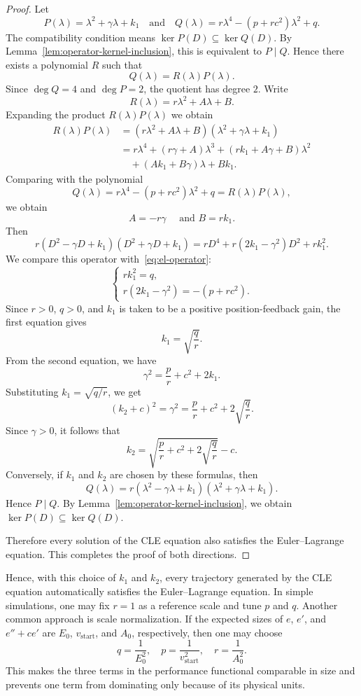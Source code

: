 ﻿\documentclass[12pt]{article}
\begin{document}
\begin{proof}
Let
\[
 P(\lambda) = \lambda^2 + \gamma\lambda + k_1\quad\text{and}\quad
 Q(\lambda) = r\lambda^4 - (p + rc^2)\lambda^2 + q.
\]
The compatibility condition means
$
 \ker P(D) \subseteq \ker Q(D)
$. By Lemma~\ref{lem:operator-kernel-inclusion}, this is equivalent to $P \mid Q$.
Hence there exists a polynomial $R$ such that
\[
 Q(\lambda) = R(\lambda)P(\lambda).
\]
Since $\deg Q = 4$ and $\deg P = 2$, the quotient has degree $2$. Write
\[
 R(\lambda) = r\lambda^2 + A\lambda + B.
\]Expanding the product $R(\lambda)P(\lambda)$ we obtain
\[
\begin{aligned}
 R(\lambda)P(\lambda)
 & = (r\lambda^2 + A\lambda + B)(\lambda^2 + \gamma\lambda + k_1)\\
 & = r\lambda^4 + (r\gamma + A)\lambda^3 + (rk_1 + A\gamma + B)\lambda^2\\
 &\quad + (Ak_1 + B\gamma)\lambda + Bk_1.
\end{aligned}
\]
Comparing with the polynomial
\[
 Q(\lambda) = r\lambda^4 - (p + rc^2)\lambda^2 + q = R(\lambda)P(\lambda),
\]
we obtain 
\[
 A = -r\gamma \quad \text{ and }B = rk_1.
\]
Then
\[
 r(D^2 - \gamma D + k_1)(D^2 + \gamma D + k_1) = rD^4 + r(2k_1 - \gamma^2)D^2 + rk_1^2.
\]
We compare this operator with~\eqref{eq:el-operator}:
\[
\begin{cases}
 rk_1^2 = q,\\
 r(2k_1 - \gamma^2) = -(p + rc^2).
\end{cases}
\]
Since $r > 0$, $q > 0$, and $k_1$ is taken to be a positive position-feedback gain, the first equation gives
\[
 k_1 = \sqrt{\frac{q}{r}}.
\]
From the second equation, we have
\[
 \gamma^2 = \frac{p}{r} + c^2 + 2k_1.
\]
Substituting $k_1 = \sqrt{q/r}$, we get
\[
 (k_2 + c)^2 = \gamma^2 = \frac{p}{r} + c^2 + 2\sqrt{\frac{q}{r}}.
\]
Since $\gamma > 0$, it follows that
\[
 k_2 = \sqrt{ \frac{p}{r} + c^2 + 2\sqrt{\frac{q}{r}} } - c.
\]
Conversely, if $k_1$ and $k_2$ are chosen by these formulas, then
\[
 Q(\lambda) = r(\lambda^2 - \gamma\lambda + k_1)(\lambda^2 + \gamma\lambda + k_1).
\]
Hence $P\mid Q$. By Lemma~\ref{lem:operator-kernel-inclusion}, we obtain
$\ker P(D) \subseteq \ker Q(D)$.

Therefore every solution of the CLE equation also satisfies the Euler--Lagrange equation. This completes the proof of both directions.
\end{proof}
Hence, with this choice of $k_1$ and $k_2$, every trajectory generated by the CLE equation automatically satisfies the Euler--Lagrange equation.  In simple simulations, one may fix $r = 1$ as a reference scale and tune $p$ and $q$. 
Another common approach is scale normalization. 
If the expected sizes of $e$, $e'$, and $e'' + ce'$ are $E_0$, $v_{\mathrm{start}}$, and $A_0$, respectively, then one may choose
\[
 q = \frac{1}{E_0^2},\quad p = \frac{1}{v_{\mathrm{start}}^2},\quad r = \frac{1}{A_0^2}.
\]
This makes the three terms in the performance functional comparable in size and prevents one term from dominating only because of its physical units.
\end{document}
